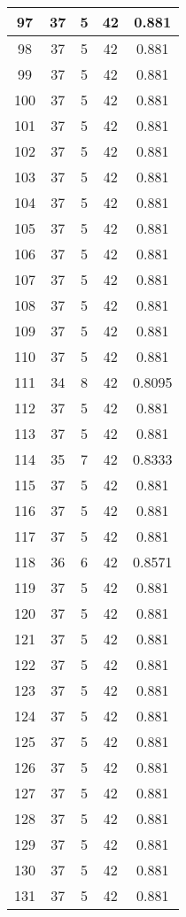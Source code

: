 \documentclass[letterpaper, 12pt]{article}
\begin{document}
\begin{longtable}{|c|c|c|c|c|}
\hline
97 & 37 & 5 & 42 & 0.881 \\
\hline
98 & 37 & 5 & 42 & 0.881 \\
\hline
99 & 37 & 5 & 42 & 0.881 \\
\hline
100 & 37 & 5 & 42 & 0.881 \\
\hline
101 & 37 & 5 & 42 & 0.881 \\
\hline
102 & 37 & 5 & 42 & 0.881 \\
\hline
103 & 37 & 5 & 42 & 0.881 \\
\hline
104 & 37 & 5 & 42 & 0.881 \\
\hline
105 & 37 & 5 & 42 & 0.881 \\
\hline
106 & 37 & 5 & 42 & 0.881 \\
\hline
107 & 37 & 5 & 42 & 0.881 \\
\hline
108 & 37 & 5 & 42 & 0.881 \\
\hline
109 & 37 & 5 & 42 & 0.881 \\
\hline
110 & 37 & 5 & 42 & 0.881 \\
\hline
111 & 34 & 8 & 42 & 0.8095 \\
\hline
112 & 37 & 5 & 42 & 0.881 \\
\hline
113 & 37 & 5 & 42 & 0.881 \\
\hline
114 & 35 & 7 & 42 & 0.8333 \\
\hline
115 & 37 & 5 & 42 & 0.881 \\
\hline
116 & 37 & 5 & 42 & 0.881 \\
\hline
117 & 37 & 5 & 42 & 0.881 \\
\hline
118 & 36 & 6 & 42 & 0.8571 \\
\hline
119 & 37 & 5 & 42 & 0.881 \\
\hline
120 & 37 & 5 & 42 & 0.881 \\
\hline
121 & 37 & 5 & 42 & 0.881 \\
\hline
122 & 37 & 5 & 42 & 0.881 \\
\hline
123 & 37 & 5 & 42 & 0.881 \\
\hline
124 & 37 & 5 & 42 & 0.881 \\
\hline
125 & 37 & 5 & 42 & 0.881 \\
\hline
126 & 37 & 5 & 42 & 0.881 \\
\hline
127 & 37 & 5 & 42 & 0.881 \\
\hline
128 & 37 & 5 & 42 & 0.881 \\
\hline
129 & 37 & 5 & 42 & 0.881 \\
\hline
130 & 37 & 5 & 42 & 0.881 \\
\hline
131 & 37 & 5 & 42 & 0.881 \\

\end{longtable}
\end{document}
